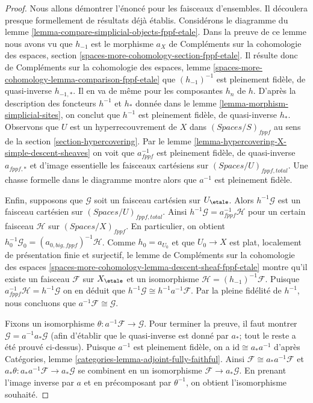 \begin{proof}
Nous allons démontrer l'énoncé pour les faisceaux d'ensembles. Il découlera
presque formellement de résultats déjà établis.
Considérons le diagramme du lemme
\ref{lemma-compare-simplicial-objects-fppf-etale}.
Dans la preuve de ce lemme nous avons vu que
$h_{-1}$ est le morphisme $a_X$ de
Compléments sur la cohomologie des espaces, section
\ref{spaces-more-cohomology-section-fppf-etale}.
Il résulte donc de
Compléments sur la cohomologie des espaces, lemme
\ref{spaces-more-cohomology-lemma-comparison-fppf-etale}
que $(h_{-1})^{-1}$ est pleinement fidèle, de quasi-inverse $h_{-1, *}$.
Il en va de même pour les composantes $h_n$ de $h$.
D'après la description des foncteurs $h^{-1}$ et $h_*$ donnée dans le
lemme \ref{lemma-morphism-simplicial-sites},
on conclut que $h^{-1}$ est pleinement fidèle, de quasi-inverse $h_*$.
Observons que $U$ est un hyperrecouvrement de $X$ dans $(\textit{Spaces}/S)_{fppf}$
au sens de la section \ref{section-hypercovering}.
Par le lemme \ref{lemma-hypercovering-X-simple-descent-sheaves}
on voit que $a_{fppf}^{-1}$ est pleinement fidèle, de quasi-inverse
$a_{fppf, *}$ et d'image essentielle les faisceaux cartésiens
sur $(\textit{Spaces}/U)_{fppf, total}$.
Une chasse formelle dans le diagramme montre alors que
$a^{-1}$ est pleinement fidèle.

\medskip\noindent
Enfin, supposons que $\mathcal{G}$ soit un faisceau cartésien sur $U_\etale$.
Alors $h^{-1}\mathcal{G}$ est un faisceau cartésien sur
$(\textit{Spaces}/U)_{fppf, total}$. Ainsi
$h^{-1}\mathcal{G} = a_{fppf}^{-1}\mathcal{H}$ pour un certain faisceau
$\mathcal{H}$ sur $(\textit{Spaces}/X)_{fppf}$.
En particulier, on obtient
$h_0^{-1}\mathcal{G}_0 = (a_{0, big, fppf})^{-1}\mathcal{H}$.
Comme $h_0 = a_{U_0}$ et que $U_0 \to X$ est
plat, localement de présentation finie et surjectif, le
lemme de Compléments sur la cohomologie des espaces
\ref{spaces-more-cohomology-lemma-descent-sheaf-fppf-etale} montre
qu'il existe un faisceau $\mathcal{F}$ sur $X_\etale$ et un isomorphisme
$\mathcal{H} = (h_{-1})^{-1}\mathcal{F}$.
Puisque $a_{fppf}^{-1}\mathcal{H} = h^{-1}\mathcal{G}$
on en déduit que $h^{-1}\mathcal{G} \cong h^{-1}a^{-1}\mathcal{F}$.
Par la pleine fidélité de $h^{-1}$, nous concluons que
$a^{-1}\mathcal{F} \cong \mathcal{G}$.

\medskip\noindent
Fixons un isomorphisme $\theta : a^{-1}\mathcal{F} \to \mathcal{G}$.
Pour terminer la preuve, il faut montrer $\mathcal{G} = a^{-1}a_*\mathcal{G}$
(afin d'établir que le quasi-inverse est donné par $a_*$; tout le reste
a été prouvé ci-dessus).
Puisque $a^{-1}$ est pleinement fidèle, on a $\text{id} \cong a_*a^{-1}$ d'après
Catégories, lemme \ref{categories-lemma-adjoint-fully-faithful}.
Ainsi $\mathcal{F} \cong a_*a^{-1}\mathcal{F}$ et
$a_*\theta : a_*a^{-1}\mathcal{F} \to a_*\mathcal{G}$
se combinent en un isomorphisme $\mathcal{F} \to a_*\mathcal{G}$.
En prenant l'image inverse par $a$ et en précomposant par $\theta^{-1}$,
on obtient l'isomorphisme souhaité.
\end{proof}

